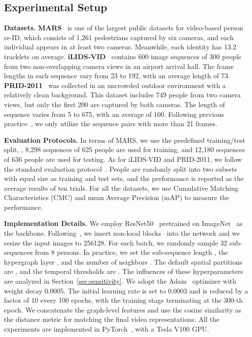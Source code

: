 \documentclass[10pt,twocolumn,letterpaper]{article}
\begin{document}
\subsection{Experimental Setup}\label{sec:imp}
\textbf{Datasets.} \textbf{MARS}~\cite{DBLP:conf/eccv/ZhengBSWSWT16} is one of the largest public datasets for video-based person re-ID, which consists of 1,261 pedestrians captured by six cameras, and each individual appears in at least two cameras. Meanwhile, each identity has 13.2 tracklets on average.
\textbf{iLIDS-VID}~\cite{DBLP:conf/eccv/WangGZW14} contains 600 image sequences of 300 people from two non-overlapping camera views in an airport arrival hall. The frame lengths in each sequence vary from 23 to 192, with an average length of 73. \textbf{PRID-2011}~\cite{DBLP:conf/scia/HirzerBRB11} was collected in an uncrowded outdoor environment with a relatively clean background. This dataset includes 749 people from two camera views, but only the first 200 are captured by both cameras. The length of sequence varies from 5 to 675, with an average of 100. Following previous practice~\cite{DBLP:conf/eccv/WangGZW14}, we only utilize the sequence pairs with more than 21 frames.

\textbf{Evaluation Protocols.} In terms of MARS, we use the predefined training/test split, \ie, 8,298 sequences of 625 people are used for training, and 12,180 sequences of 636 people are used for testing. As for iLIDS-VID and PRID-2011, we follow the standard evaluation protocol~\cite{DBLP:conf/eccv/WangGZW14}. People are randomly split into two subsets with equal size as training and test sets, and the performance is reported as the average results of ten trials. For all the datasets, we use Cumulative Matching Characteristics (CMC) and mean Average Precision (mAP) to measure the performance.

\textbf{Implementation Details.} We employ ResNet50~\cite{DBLP:conf/cvpr/HeZRS16} pretrained on ImageNet~\cite{DBLP:conf/cvpr/DengDSLL009} as the backbone. Following~\cite{DBLP:conf/cvpr/HouMCGSC19}, we insert non-local blocks~\cite{DBLP:conf/cvpr/0004GGH18} into the network and we resize the input images to 256128. For each batch, we randomly sample 32 sub-sequences from 8 persons. In practice, we set the sub-sequence length , the hypergraph layer , and the number of neighbors . The default spatial partitions are , and the temporal thresholds are . The influences of these hyperparameters are analyzed in Section~\ref{sec:sensitivity}. We adopt the Adam~\cite{DBLP:journals/corr/KingmaB14} optimizer with weight decay 0.0005. The initial learning rate is set to 0.0003 and is reduced by a factor of 10 every 100 epochs, with the training stage terminating at the 300-th epoch. We concatenate the graph-level features and use the cosine similarity as the distance metric for matching the final video representations. All the experiments are implemented in PyTorch~\cite{paszke2017automatic}, with a Tesla V100 GPU. 
\end{document}
